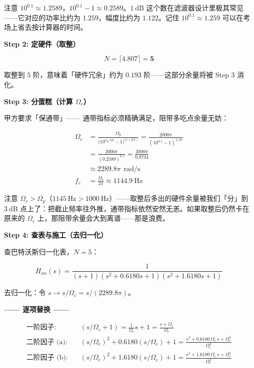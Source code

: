 \documentclass[12pt,a4paper]{ctexart}
\newcommand{\Omegac}{\Omega_c}
\newcommand{\db}{\ \mathrm{dB}}
\newcommand{\Hz}{\ \mathrm{Hz}}
\newcommand{\rads}{\ \mathrm{rad/s}}
\newcommand{\HanNorm}{H_{\!an}(s)}
\newcommand{\ceil}[1]{\bigl\lceil #1 \bigr\rceil}
\begin{document}
\begin{insight}
注意 $10^{0.1} \approx 1.2589$，$10^{0.1}-1 \approx 0.2589$。$1\db$ 这个数在滤波器设计里极其常见——它对应的功率比约为 $1.259$，幅度比约为 $1.122$。记住 $10^{0.1}\approx 1.259$ 可以在考场上省去按计算器的时间。
\end{insight}

\textbf{\color{deepgreen!90}Step 2: 定硬件（取整）}

\[
N = \ceil{4.807} = \mathbf{5}
\]

取整到 $5$ 阶，意味着「硬件冗余」约为 $0.193$ 阶——这部分余量将被 Step 3 消化。

\vspace{4pt}

\textbf{\color{chebyshev!90}Step 3: 分蛋糕（计算 $\Omega_c$）}

甲方要求「保通带」—— 通带指标必须精确满足，阻带多吃点余量无妨：

\begin{align*}
\Omegac &= \frac{\Omega_p}{\bigl(10^{\alpha_p/10}-1\bigr)^{1/(2N)}}
         = \frac{2000\pi}{(10^{0.1}-1)^{1/10}} \\[4pt]
        &= \frac{2000\pi}{(0.2589)^{0.1}}
         = \frac{2000\pi}{0.8734} \\[4pt]
        &\approx 2289.8\pi \ \rads \\[4pt]
f_c &= \frac{\Omega_c}{2\pi} \approx 1144.9 \ \mathrm{Hz}
\end{align*}

\begin{insight}
注意 $\Omega_c > \Omega_p$（$1145\Hz > 1000\Hz$）——取整后多出的硬件余量被我们「分」到 $3\db$ 点上了：把截止频率往外推，通带指标依然安然无恙。如果取整后仍然卡在原来的 $\Omega_c$ 上，那阻带余量会大到离谱——那是浪费。
\end{insight}

\textbf{\color{black!80}Step 4: 查表与施工（去归一化）}

查巴特沃斯归一化表，$N=5$：

\[
\HanNorm = \frac{1}{(s+1)(s^2 + 0.6180s + 1)(s^2 + 1.6180s + 1)}
\]

去归一化：令 $s \to s/\Omegac = s/(2289.8\pi)$。

\textbf{—— 逐项替换 ——}

\begin{align*}
\text{一阶因子:}&\quad (s/\Omegac + 1)
    = \frac{1}{\Omegac}s + 1
    = \frac{s + \Omegac}{\Omegac} \\[4pt]
\text{二阶因子 (a):}&\quad (s/\Omegac)^2 + 0.6180(s/\Omegac) + 1
    = \frac{s^2 + 0.6180\,\Omegac\,s + \Omegac^2}{\Omegac^2} \\[4pt]
\text{二阶因子 (b):}&\quad (s/\Omegac)^2 + 1.6180(s/\Omegac) + 1
    = \frac{s^2 + 1.6180\,\Omegac\,s + \Omegac^2}{\Omegac^2}
\end{align*}
\end{document}
